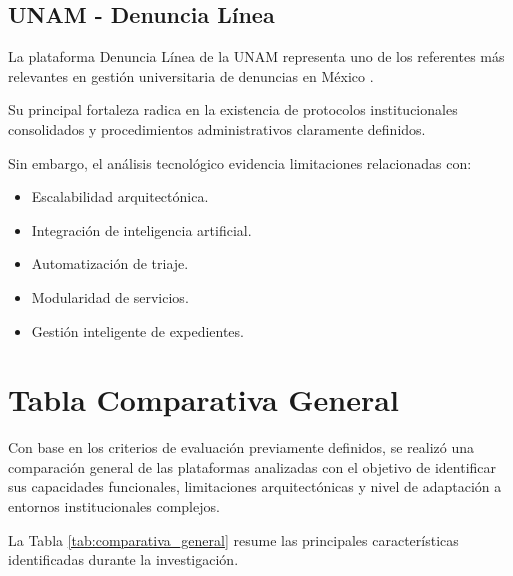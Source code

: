 \subsection{UNAM - Denuncia Línea}

\begin{flushleft}
\justifying

La plataforma Denuncia Línea de la UNAM representa uno de los referentes más relevantes en gestión universitaria de denuncias en México \cite{24}.

Su principal fortaleza radica en la existencia de protocolos institucionales consolidados y procedimientos administrativos claramente definidos.

Sin embargo, el análisis tecnológico evidencia limitaciones relacionadas con:

\begin{itemize}

    \item Escalabilidad arquitectónica.
    
    \item Integración de inteligencia artificial.
    
    \item Automatización de triaje.
    
    \item Modularidad de servicios.
    
    \item Gestión inteligente de expedientes.

\end{itemize}

\end{flushleft}


\section{Tabla Comparativa General}

\begin{flushleft}
\justifying

Con base en los criterios de evaluación previamente definidos, se realizó una comparación general de las plataformas analizadas con el objetivo de identificar sus capacidades funcionales, limitaciones arquitectónicas y nivel de adaptación a entornos institucionales complejos.

La Tabla \ref{tab:comparativa_general} resume las principales características identificadas durante la investigación.

\end{flushleft}

